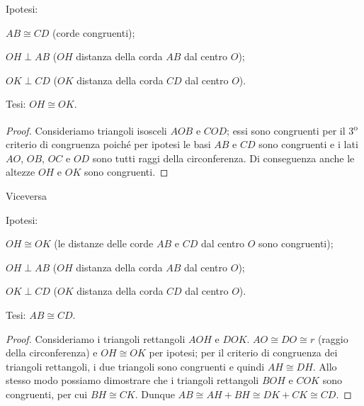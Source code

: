 \noindent\begin{minipage}{0.65\textwidth}\parindent15pt
\noindent Ipotesi:
\begin{itemize*}
\item \(AB\cong CD\) (corde congruenti);
\item \(OH\perp AB\) (\(OH\) distanza della corda \(AB\) dal centro \(O\));
\item \(OK\perp CD\) (\(OK\) distanza della corda \(CD\) dal centro \(O\)).
\end{itemize*}
\noindent Tesi: \(OH\cong OK\).

\begin{proof}
Consideriamo triangoli isosceli \(AOB\) e \(COD\); essi sono congruenti 
per il 3\textsuperscript{o} criterio di congruenza poiché per ipotesi 
le basi \(AB\) e \(CD\) sono congruenti e i lati \(AO\), \(OB\), \(OC\) e \(OD\) 
sono tutti raggi della circonferenza.
Di conseguenza anche le altezze \(OH\) e \(OK\) sono congruenti.
\end{proof}
\end{minipage}\hfil
\begin{minipage}{0.35\textwidth}
  \centering
\end{minipage}\vspace{8pt}

\noindent Viceversa\vspace{5pt}

\noindent Ipotesi:
\begin{itemize*}
\item \(OH\cong OK\) (le distanze delle corde \(AB\) e \(CD\) dal centro 
\(O\) sono congruenti);
\item \(OH\perp AB\) (\(OH\) distanza della corda \(AB\) dal centro \(O\));
\item \(OK\perp CD\) (\(OK\) distanza della corda \(CD\) dal centro \(O\)).
\end{itemize*}
\noindent Tesi: \(AB\cong CD\).

\begin{proof}
Consideriamo i triangoli rettangoli \(AOH\) e \(DOK\). \(AO\cong DO\cong 
r\) (raggio della circonferenza) e \(OH\cong OK\) per ipotesi; per il 
criterio di congruenza dei triangoli rettangoli, i due triangoli sono 
congruenti e quindi \(AH\cong DH\). Allo stesso modo possiamo 
dimostrare che i triangoli rettangoli \(BOH\) e \(COK\) sono congruenti, 
per cui \(BH\cong CK\). Dunque \(AB \cong AH + BH \cong DK + CK \cong 
CD\).
\end{proof}


